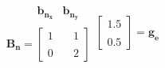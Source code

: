 \documentclass[preview]{standalone}
\begin{document}
\begin{align*}
\begin{array}{cc}\begin{matrix}\hspace{1cm} \mathbf{b_{n_x}}  & \mathbf{b_{n_y}} \end{matrix} \\ \mathbf{B_n} = \begin{bmatrix} 1 & \quad 1 \\ \\0 &  \quad 2 \end{bmatrix} \end{array}\begin{bmatrix} 1.5 \\ \\ 0.5 \end{bmatrix} = \mathbf{g_e}
\end{align*}
\end{document}
